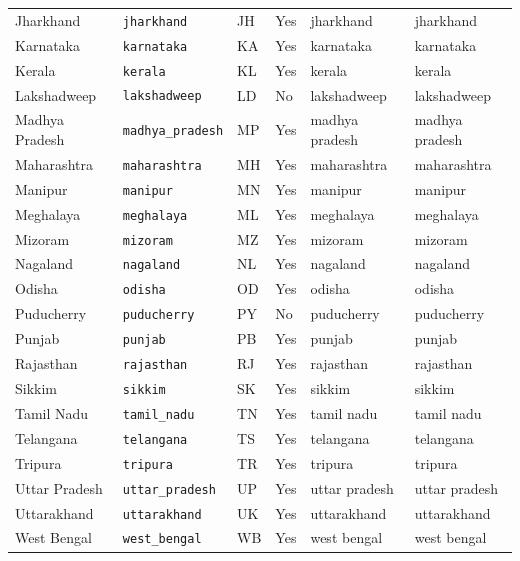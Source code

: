 \begin{longtable}{@{}>{\raggedright\arraybackslash}p{2.8cm} l l l >{\raggedright\arraybackslash}p{2.8cm} >{\raggedright\arraybackslash}p{2.8cm}@{}}
Jharkhand & \texttt{jharkhand} & JH & Yes & jharkhand & jharkhand \\
Karnataka & \texttt{karnataka} & KA & Yes & karnataka & karnataka \\
Kerala & \texttt{kerala} & KL & Yes & kerala & kerala \\
Lakshadweep & \texttt{lakshadweep} & LD & No & lakshadweep & lakshadweep \\
Madhya Pradesh & \texttt{madhya\_pradesh} & MP & Yes & madhya pradesh & madhya pradesh \\
Maharashtra & \texttt{maharashtra} & MH & Yes & maharashtra & maharashtra \\
Manipur & \texttt{manipur} & MN & Yes & manipur & manipur \\
Meghalaya & \texttt{meghalaya} & ML & Yes & meghalaya & meghalaya \\
Mizoram & \texttt{mizoram} & MZ & Yes & mizoram & mizoram \\
Nagaland & \texttt{nagaland} & NL & Yes & nagaland & nagaland \\
Odisha & \texttt{odisha} & OD & Yes & odisha & odisha \\
Puducherry & \texttt{puducherry} & PY & No & puducherry & puducherry \\
Punjab & \texttt{punjab} & PB & Yes & punjab & punjab \\
Rajasthan & \texttt{rajasthan} & RJ & Yes & rajasthan & rajasthan \\
Sikkim & \texttt{sikkim} & SK & Yes & sikkim & sikkim \\
Tamil Nadu & \texttt{tamil\_nadu} & TN & Yes & tamil nadu & tamil nadu \\
Telangana & \texttt{telangana} & TS & Yes & telangana & telangana \\
Tripura & \texttt{tripura} & TR & Yes & tripura & tripura \\
Uttar Pradesh & \texttt{uttar\_pradesh} & UP & Yes & uttar pradesh & uttar pradesh \\
Uttarakhand & \texttt{uttarakhand} & UK & Yes & uttarakhand & uttarakhand \\
West Bengal & \texttt{west\_bengal} & WB & Yes & west bengal & west bengal \\
\bottomrule
\end{longtable}
